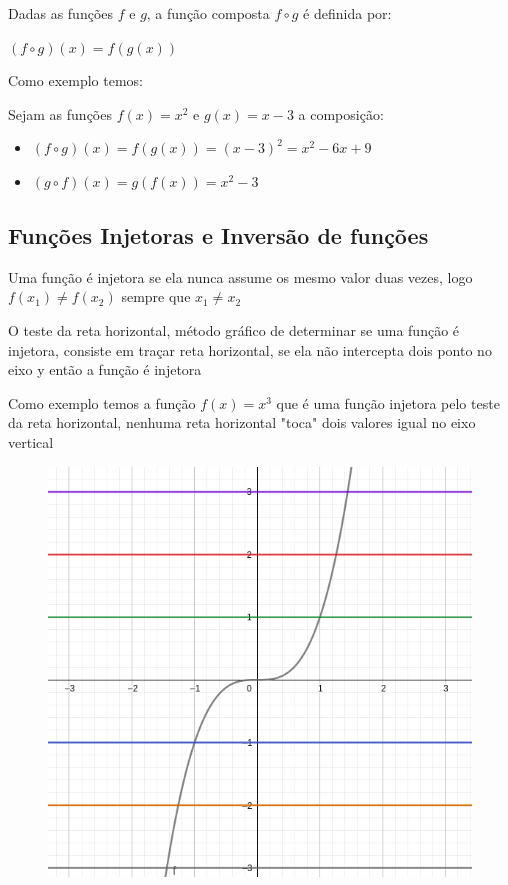 \begin{multicols*}{2}
            \begin{theorem}
            Dadas as funções $f$ e $g$, a função composta $f \circ g$ é definida por:
            
            $(f \circ g)(x) = f(g(x))$
            \end{theorem}
            Como exemplo temos:
            
            Sejam as funções $f(x) = x^2$ e $g(x) = x -3 $ a composição:
            \begin{itemize}
            \item $(f \circ g)(x) = f(g(x)) = (x-3)^2 = x^2 -6x + 9$
            \item $(g \circ f)(x) = g(f(x)) = x^2 - 3$
            \end{itemize}
            
            \subsection*{Funções Injetoras e Inversão de funções}
            Uma função é injetora se ela nunca assume os mesmo valor duas vezes, logo $f(x_1) \ne f(x_2)$ 			sempre que $x_1 \ne x_2$				
            
            \begin{theorem}
            O teste da reta horizontal, método gráfico de determinar se uma função é injetora, consiste em 			traçar reta horizontal, se ela não intercepta dois ponto no eixo y então a função é injetora
            \end{theorem}
            
            Como exemplo temos a função $f(x) = x^3$ que é uma função injetora pelo teste da reta 					horizontal, nenhuma reta horizontal "toca" dois valores igual no eixo vertical
            \begin{figure}[H]
                    \includegraphics[scale=0.3]{assets/rafael/img37.png}
            \end{figure}		
            

\end{multicols*}
